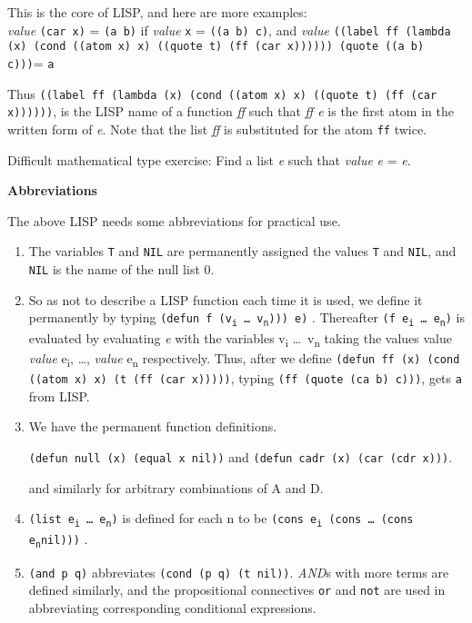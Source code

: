 \documentclass[8pt,letter,twocolumn]{article}
\newcommand{\args}[1] {#1\textsubscript{i} \dots \ #1\textsubscript{n}}
\newcommand{\ei}[0] {e\textsubscript{i}}
\newcommand{\en}[0] {e\textsubscript{n}}
\begin{document}
This is the core of LISP, and here are more examples:  \\

\textit{value} \texttt{(car x)} = \texttt{(a b)} if \textit{value} \texttt{x} =
\texttt{((a b) c)}, and \textit{value} \texttt{((label ff (lambda (x) (cond
  ((atom x) x) ((quote t) (ff (car x)))))) (quote ((a b) c)))}= \texttt{a}

Thus \texttt{((label ff (lambda (x) (cond ((atom x) x) ((quote t) (ff (car
  x))))))}, is the LISP name of a function \textit{ff} such that \textit{ff e}
is the first atom in the written form of \textit{e}. Note that the list
\textit{ff} is substituted for the atom \texttt{ff} twice.

Difficult mathematical type exercise: Find a list \textit{e} such that
\textit{value} \textit{e} = \textit{e}.

\vspace*{1\baselineskip}
\textbf{Abbreviations}
\vspace*{1\baselineskip}

The above LISP needs some abbreviations for practical use.

\begin{enumerate}
\setlength\itemsep{0em}

\item The variables \texttt{T} and \texttt{NIL} are permanently assigned the
  values \texttt{T} and \texttt{NIL}, and \texttt{NIL} is the name of the null
  list 0.

\item So as not to describe a LISP function each time it is used, we define it
  permanently by typing \texttt{(defun f (\args{v}))) e)} . Thereafter
  \texttt{(f \args{e})} is evaluated by evaluating \textit{e} with the variables
  \args{v} taking the values value \textit{value} \ei, \dots, \textit{value} \en
  respectively. Thus, after we define \texttt{(defun ff (x) (cond ((atom x) x)
    (t (ff (car x)))))}, typing \texttt{(ff (quote (ca b) c)))}, gets \texttt{a}
  from LISP.

\item We have the permanent function definitions.

  \texttt{(defun null (x) (equal x nil))} and \texttt{(defun cadr (x) (car (cdr
    x)))}.

  and similarly for arbitrary combinations of A and D.

\item \texttt{(list \args{e})} is defined for each n to be \texttt{(cons \ei
    (cons \dots \ (cons \en nil)))} .

\item \texttt{(and p q)} abbreviates \texttt{(cond (p q) (t nil))}.
  \textit{AND}s with more terms are defined similarly, and the propositional
  connectives \texttt{or} and \texttt{not} are used in abbreviating
  corresponding conditional expressions.

\end{enumerate}
\end{document}
